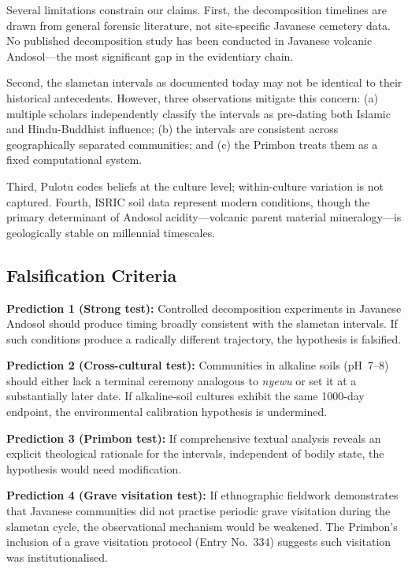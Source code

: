 \documentclass[12pt,a4paper]{article}
\begin{document}
Several limitations constrain our claims. First, the decomposition timelines are drawn from general forensic literature, not site-specific Javanese cemetery data. No published decomposition study has been conducted in Javanese volcanic Andosol---the most significant gap in the evidentiary chain.

Second, the slametan intervals as documented today may not be identical to their historical antecedents. However, three observations mitigate this concern: (a) multiple scholars independently classify the intervals as pre-dating both Islamic and Hindu-Buddhist influence; (b) the intervals are consistent across geographically separated communities; and (c) the Primbon treats them as a fixed computational system.

Third, Pulotu codes beliefs at the culture level; within-culture variation is not captured. Fourth, ISRIC soil data represent modern conditions, though the primary determinant of Andosol acidity---volcanic parent material mineralogy---is geologically stable on millennial timescales.

\subsection{Falsification Criteria}

\textbf{Prediction 1 (Strong test):} Controlled decomposition experiments in Javanese Andosol should produce timing broadly consistent with the slametan intervals. If such conditions produce a radically different trajectory, the hypothesis is falsified.

\textbf{Prediction 2 (Cross-cultural test):} Communities in alkaline soils (pH~7--8) should either lack a terminal ceremony analogous to \textit{nyewu} or set it at a substantially later date. If alkaline-soil cultures exhibit the same 1000-day endpoint, the environmental calibration hypothesis is undermined.

\textbf{Prediction 3 (Primbon test):} If comprehensive textual analysis reveals an explicit theological rationale for the intervals, independent of bodily state, the hypothesis would need modification.

\textbf{Prediction 4 (Grave visitation test):} If ethnographic fieldwork demonstrates that Javanese communities did not practise periodic grave visitation during the slametan cycle, the observational mechanism would be weakened. The Primbon's inclusion of a grave visitation protocol (Entry No.~334) suggests such visitation was institutionalised.
\end{document}
